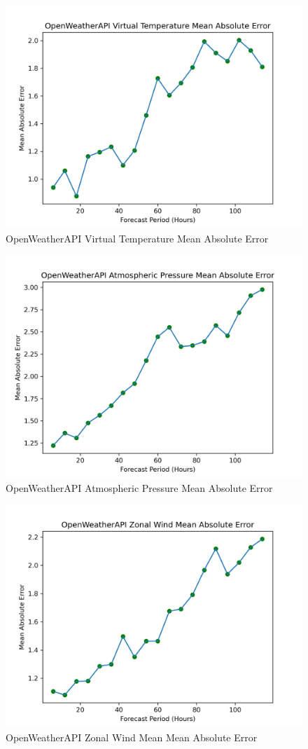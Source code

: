 \begin{appendices}
    \begin{figure}[H]
        \centering
        \includegraphics[width=.7\linewidth]{Graphs/accuracy/appendices/openweatherapi/virtual_temperature/mean_absolute_error.png}
        \caption{OpenWeatherAPI Virtual Temperature Mean Absolute Error}
    \end{figure}
    
    \begin{figure}[H]
        \centering
        \includegraphics[width=.7\linewidth]{Graphs/accuracy/appendices/openweatherapi/atmospheric_pressure/mean_absolute_error.png}
        \caption{OpenWeatherAPI Atmospheric Pressure Mean Absolute Error}
    \end{figure}
    
    \begin{figure}[H]
        \centering
        \includegraphics[width=.7\linewidth]{Graphs/accuracy/appendices/openweatherapi/zonal_wind/mean_absolute_error.png}
        \caption{OpenWeatherAPI Zonal Wind Mean Mean Absolute Error}
    \end{figure}
    

\end{appendices}

